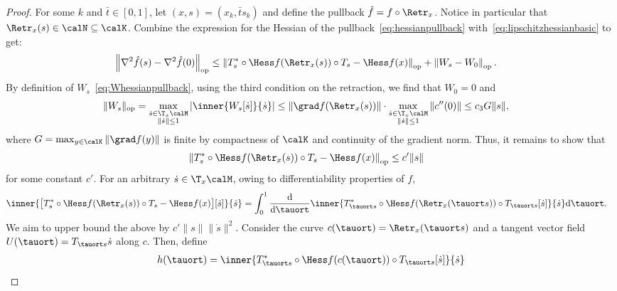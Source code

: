 \begin{proof}
	For some $k$ and $\bar t \in [0, 1]$, let $(x, s) = (x_k, \bar t s_k)$ and define the pullback $\hat f = f \circ \Retr_x$. Notice in particular that $\Retr_x(s) \in \calN \subseteq \calK$.
	Combine the expression for the Hessian of the pullback~\eqref{eq:hessianpullback} with~\eqref{eq:lipschitzhessianbasic} to get:
	\begin{align*}
	\left\| \nabla^2 \hat f(s) - \nabla^2 \hat f(0) \right\|_{\mathrm{op}} & \leq \left\| T_{s}^* \circ \Hess f(\Retr_x(s)) \circ T_{s} - \Hess f(x) \right\|_{\mathrm{op}} + \left\|  W_{s} - W_0 \right\|_{\mathrm{op}}.
	\end{align*}
	By definition of $W_s$~\eqref{eq:Whessianpullback}, using the third condition on the retraction, we find that $W_0 = 0$ and
	\begin{align*}
	\|W_s\|_\mathrm{op} & = \max_{\substack{\dot s \in \T_x\calM \\ \|\dot s\| \leq 1}} \left| \inner{W_s[\dot s]}{\dot s} \right| \leq \|\grad f(\Retr_x(s))\| \cdot \max_{\substack{\dot s \in \T_x\calM \\ \|\dot s\| \leq 1}} \|c''(0)\| \leq c_3 G \|s\|,
	\end{align*}
	where $G = \max_{y \in \calK} \|\grad f(y)\|$ is finite by compactness of $\calK$ and continuity of the gradient norm.
	Thus, it remains to show that
	\begin{align*}
	\left\| T_s^* \circ \Hess f(\Retr_x(s)) \circ T_s - \Hess f(x) \right\|_{\mathrm{op}} & \leq c' \|s\|
	\end{align*}
	for some constant $c'$. For an arbitrary $\dot s \in \T_x\calM$, owing to differentiability properties of $f$, %
	\begin{align}
		\inner{\big[T_s^* \circ \Hess f(\Retr_x(s)) \circ T_s - \Hess f(x)\big][\dot s]}{\dot s} & = \int_{0}^{1} \frac{\mathrm{d}}{\mathrm{d}\tauort}  \inner{T_{\tauort s}^* \circ \Hess f(\Retr_x(\tauort s)) \circ T_{\tauort s} [\dot s]}{\dot s}  \mathrm{d}\tauort.
		\label{eq:integralddth}
	\end{align}
	We aim to upper bound the above by $c' \|s\| \|\dot s\|^2$.
	Consider the curve $c(\tauort) = \Retr_{x}(\tauort s)$ and a tangent vector field $U(\tauort) = T_{\tauort s} \dot s$ along $c$. Then, define
	\begin{align*}
	h(\tauort) & = \inner{T_{\tauort s}^* \circ \Hess f(c(\tauort)) \circ T_{\tauort s} [\dot s]}{\dot s} \\

\end{align*}
\end{proof}
